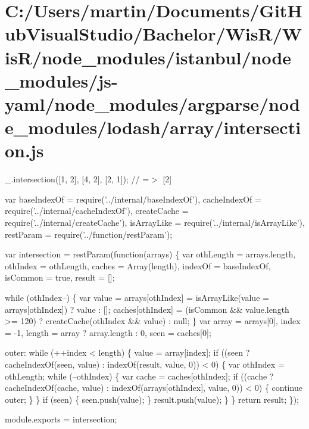 \hypertarget{_c_1_2_users_2martin_2_documents_2_git_hub_visual_studio_2_bachelor_2_wis_r_2_wis_r_2node_moduled6c8f8acb03d2be641773a33a65c7929}{}\section{C\+:/\+Users/martin/\+Documents/\+Git\+Hub\+Visual\+Studio/\+Bachelor/\+Wis\+R/\+Wis\+R/node\+\_\+modules/istanbul/node\+\_\+modules/js-\/yaml/node\+\_\+modules/argparse/node\+\_\+modules/lodash/array/intersection.\+js}
\+\_\+.\+intersection(\mbox{[}1, 2\mbox{]}, \mbox{[}4, 2\mbox{]}, \mbox{[}2, 1\mbox{]}); // =$>$ \mbox{[}2\mbox{]}


\begin{DoxyCodeInclude}
var baseIndexOf = require(\textcolor{stringliteral}{'../internal/baseIndexOf'}),
    cacheIndexOf = require(\textcolor{stringliteral}{'../internal/cacheIndexOf'}),
    createCache = require(\textcolor{stringliteral}{'../internal/createCache'}),
    isArrayLike = require(\textcolor{stringliteral}{'../internal/isArrayLike'}),
    restParam = require(\textcolor{stringliteral}{'../function/restParam'});

var intersection = restParam(\textcolor{keyword}{function}(arrays) \{
  var othLength = arrays.length,
      othIndex = othLength,
      caches = Array(length),
      indexOf = baseIndexOf,
      isCommon = \textcolor{keyword}{true},
      result = [];

  \textcolor{keywordflow}{while} (othIndex--) \{
    var value = arrays[othIndex] = isArrayLike(value = arrays[othIndex]) ? value : [];
    caches[othIndex] = (isCommon && value.length >= 120) ? createCache(othIndex && value) : null;
  \}
  var array = arrays[0],
      index = -1,
      length = array ? array.length : 0,
      seen = caches[0];

  outer:
  \textcolor{keywordflow}{while} (++index < length) \{
    value = array[index];
    \textcolor{keywordflow}{if} ((seen ? cacheIndexOf(seen, value) : indexOf(result, value, 0)) < 0) \{
      var othIndex = othLength;
      \textcolor{keywordflow}{while} (--othIndex) \{
        var cache = caches[othIndex];
        \textcolor{keywordflow}{if} ((cache ? cacheIndexOf(cache, value) : indexOf(arrays[othIndex], value, 0)) < 0) \{
          \textcolor{keywordflow}{continue} outer;
        \}
      \}
      \textcolor{keywordflow}{if} (seen) \{
        seen.push(value);
      \}
      result.push(value);
    \}
  \}
  \textcolor{keywordflow}{return} result;
\});

module.exports = intersection;
\end{DoxyCodeInclude}
 